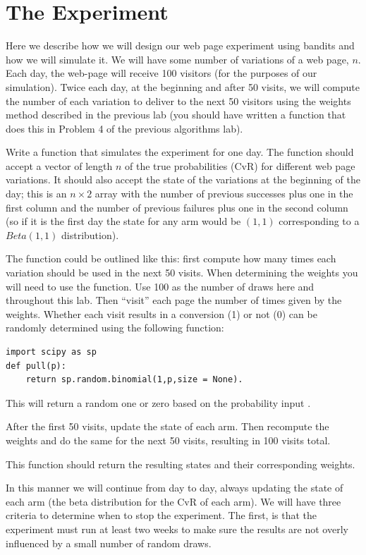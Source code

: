 \section*{The Experiment}
Here we describe how we will design our web page experiment using bandits and how we will simulate it.
We will have some number of variations of a web page, $n$.  Each day, the web-page will receive 100 visitors
(for the purposes of our simulation).  Twice each day, at the beginning and after 50 visits,
we will compute the number of each variation to deliver to the next 50 visitors using the weights
method described in the previous lab (you should have written a function that does this in Problem 4
of the previous algorithms lab).

\begin{problem}
Write a function that simulates the experiment for one day.
The function should accept a vector of length $n$ of the true probabilities (CvR)
for different web page variations.  It should also accept the state of the variations
at the beginning of the day; this is an $n \times 2$ array with the number of previous
successes plus one in the first column and the number of previous failures plus one in
the second column (so if it is the first day the state for any arm would be $(1,1)$
corresponding to a $Beta(1,1)$ distribution).

The function could be outlined like this: first compute how many times each variation
should be used in the next 50 visits.  When determining the weights you will need to use
the  function.  Use 100 as the number of draws here and throughout this lab.
Then ``visit'' each page the number of times given by the weights.
Whether each visit results in a conversion (1) or not (0) can be randomly determined using the following function:
\begin{lstlisting}
import scipy as sp
def pull(p):
    return sp.random.binomial(1,p,size = None).
\end{lstlisting}
This will return a random one or zero based on the probability input .

After the first 50 visits, update the state of each arm.
Then recompute the weights and do the same for the next 50 visits, resulting in 100 visits total.

This function should return the resulting states and their corresponding weights.
\end{problem}

In this manner we will continue from day to day, always updating the state of each arm
(the beta distribution for the CvR of each arm).  We will have three criteria to determine when to stop the experiment.
The first, is that the experiment must run at least two weeks to make sure the
results are not overly influenced by a small number of random draws.


